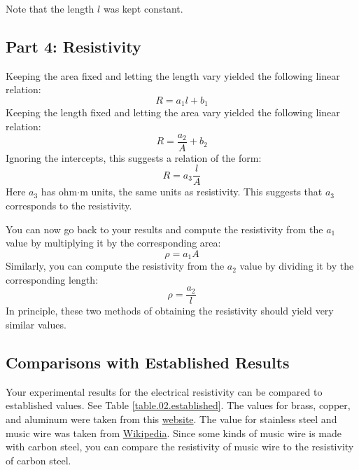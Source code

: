 Note that the length $l$ was kept constant.
\subsection{Part 4: Resistivity}
Keeping the area fixed and letting the length vary yielded the following linear relation:
\begin{equation}
	R = a_{1} l + b_{1}
\end{equation}
Keeping the length fixed and letting the area vary yielded the following linear relation:
\begin{equation}
	R = \frac{a_{2}}{A} + b_{2}
\end{equation}
Ignoring the intercepts, this suggests a relation of the form:
\begin{equation}
	R = a_{3} \frac{l}{A}
\end{equation}
Here $a_{3}$ has ohm$\cdot$m units, the same units as resistivity. This suggests that $a_{3}$ corresponds to the resistivity.

You can now go back to your results and compute the resistivity from the $a_{1}$ value by multiplying it by the corresponding area:
\begin{equation}
	\rho = a_{1} A
\end{equation}
Similarly, you can compute the resistivity from the $a_{2}$ value by dividing it by the corresponding length:
\begin{equation}
	\rho = \frac{a_{2}}{l}
\end{equation}
In principle, these two methods of obtaining the resistivity should yield very similar values.
\subsection{Comparisons with Established Results}
Your experimental results for the electrical resistivity can be compared to established values. See Table \ref{table.02.established}. The values for brass, copper, and aluminum were taken from this \href{http://www.radio-electronics.com/info/formulae/resistance/resistivity-table.php}{website}. The value for stainless steel and music wire was taken from \href{https://en.wikipedia.org/wiki/Electrical_resistivity_and_conductivity}{Wikipedia}. Since some kinds of music wire is made with carbon steel, you can compare the resistivity of music wire to the resistivity of carbon steel.
